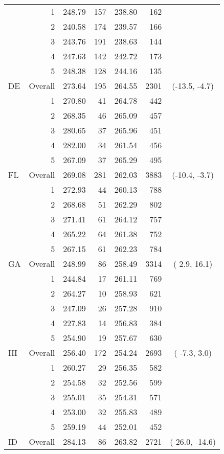 \begin{longtable}{lrrr@{\extracolsep{.25cm}}rrc}
   & 1 & 248.79 & 157 & 238.80 & 162 &  \\ 
   & 2 & 240.58 & 174 & 239.57 & 166 &  \\ 
   & 3 & 243.76 & 191 & 238.63 & 144 &  \\ 
   & 4 & 247.63 & 142 & 242.72 & 173 &  \\ 
   & 5 & 248.38 & 128 & 244.16 & 135 &  \\ 
   \hline
DE & Overall & 273.64 & 195 & 264.55 & 2301 & (-13.5,  -4.7) \\ 
   & 1 & 270.80 &  41 & 264.78 & 442 &  \\ 
   & 2 & 268.35 &  46 & 265.09 & 457 &  \\ 
   & 3 & 280.65 &  37 & 265.96 & 451 &  \\ 
   & 4 & 282.00 &  34 & 261.54 & 456 &  \\ 
   & 5 & 267.09 &  37 & 265.29 & 495 &  \\ 
   \hline
FL & Overall & 269.08 & 281 & 262.03 & 3883 & (-10.4,  -3.7) \\ 
   & 1 & 272.93 &  44 & 260.13 & 788 &  \\ 
   & 2 & 268.68 &  51 & 262.29 & 802 &  \\ 
   & 3 & 271.41 &  61 & 264.12 & 757 &  \\ 
   & 4 & 265.22 &  64 & 261.38 & 752 &  \\ 
   & 5 & 267.15 &  61 & 262.23 & 784 &  \\ 
   \hline
GA & Overall & 248.99 &  86 & 258.49 & 3314 & (  2.9,  16.1) \\ 
   & 1 & 244.84 &  17 & 261.11 & 769 &  \\ 
   & 2 & 264.27 &  10 & 258.93 & 621 &  \\ 
   & 3 & 247.09 &  26 & 257.28 & 910 &  \\ 
   & 4 & 227.83 &  14 & 256.83 & 384 &  \\ 
   & 5 & 254.90 &  19 & 257.67 & 630 &  \\ 
   \hline
HI & Overall & 256.40 & 172 & 254.24 & 2693 & ( -7.3,   3.0) \\ 
   & 1 & 260.27 &  29 & 256.35 & 582 &  \\ 
   & 2 & 254.58 &  32 & 252.56 & 599 &  \\ 
   & 3 & 255.01 &  35 & 254.31 & 571 &  \\ 
   & 4 & 253.00 &  32 & 255.83 & 489 &  \\ 
   & 5 & 259.19 &  44 & 252.01 & 452 &  \\ 
   \hline
ID & Overall & 284.13 &  86 & 263.82 & 2721 & (-26.0, -14.6) \\ 

\end{longtable}
